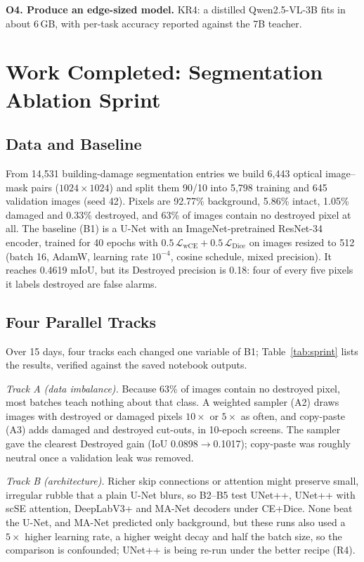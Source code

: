 \documentclass[conference]{IEEEtran}
\begin{document}
\textbf{O4. Produce an edge-sized model.} KR4: a distilled Qwen2.5-VL-3B fits in about 6\,GB, with per-task accuracy reported against the 7B teacher.

\section{Work Completed: Segmentation Ablation Sprint}
\subsection{Data and Baseline}
From 14,531 building-damage segmentation entries we build 6,443 optical image--mask pairs ($1024\times1024$) and split them 90/10 into 5,798 training and 645 validation images (seed 42). Pixels are 92.77\% background, 5.86\% intact, 1.05\% damaged and 0.33\% destroyed, and 63\% of images contain no destroyed pixel at all. The baseline (B1) is a U-Net with an ImageNet-pretrained ResNet-34~\cite{resnet} encoder, trained for 40 epochs with $0.5\,\mathcal{L}_{\mathrm{wCE}}+0.5\,\mathcal{L}_{\mathrm{Dice}}$ on images resized to 512 (batch 16, AdamW, learning rate $10^{-4}$, cosine schedule, mixed precision). It reaches 0.4619 mIoU, but its Destroyed precision is 0.18: four of every five pixels it labels destroyed are false alarms.

\subsection{Four Parallel Tracks}
Over 15 days, four tracks each changed one variable of B1; Table~\ref{tab:sprint} lists the results, verified against the saved notebook outputs.

\textit{Track A (data imbalance).} Because 63\% of images contain no destroyed pixel, most batches teach nothing about that class. A weighted sampler (A2) draws images with destroyed or damaged pixels $10\times$ or $5\times$ as often, and copy-paste (A3) adds damaged and destroyed cut-outs, in 10-epoch screens. The sampler gave the clearest Destroyed gain (IoU 0.0898$\rightarrow$0.1017); copy-paste was roughly neutral once a validation leak was removed.

\textit{Track B (architecture).} Richer skip connections or attention might preserve small, irregular rubble that a plain U-Net blurs, so B2--B5 test UNet++, UNet++ with scSE attention, DeepLabV3+ and MA-Net decoders under CE+Dice. None beat the U-Net, and MA-Net predicted only background, but these runs also used a $5\times$ higher learning rate, a higher weight decay and half the batch size, so the comparison is confounded; UNet++ is being re-run under the better recipe (R4).
\end{document}
